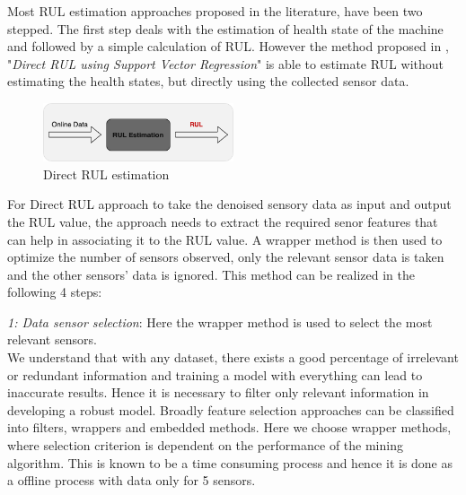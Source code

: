 Most RUL estimation approaches proposed in the literature, have been two stepped. The first step deals with the estimation of health state of the machine and followed by a simple calculation of RUL. However the method proposed in \cite{DBLP:journals/tie/KhelifCMLFZ17} , "\textit{Direct RUL using Support Vector Regression}" is able to estimate RUL without estimating the health states, but directly using the collected sensor data.
\begin{figure}[ht]
    \centering
    \includegraphics[width=0.5\textwidth]{gfx/rul_direct_rul}
    \caption{Direct RUL estimation \cite{DBLP:journals/tie/KhelifCMLFZ17}}
    \label{fig:direct_rul}
\end{figure}

For Direct RUL approach to take the denoised sensory data as input and output the RUL value, the approach needs to extract the required senor features that can help in associating it to the RUL value. A wrapper method is then used to optimize the number of sensors observed, only the relevant sensor data is taken and the other sensors' data is ignored. This method can be realized in the following 4 steps:

\textit{1: Data sensor selection}: Here the wrapper method is used to select the most relevant sensors.\\
We understand that with any dataset, there exists a good percentage of irrelevant or redundant information and training a model with everything can lead to inaccurate results. Hence it is necessary to filter only relevant information in developing a robust model. Broadly feature selection approaches can be classified into filters, wrappers and embedded methods.
Here we choose wrapper methods, where selection criterion is dependent on the performance of the mining algorithm. This is known to be a time consuming process and hence it is done as a offline process with data only for 5 sensors.

